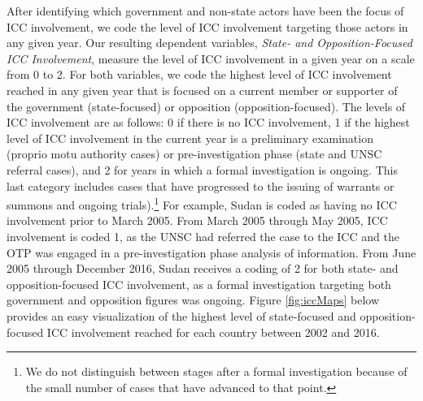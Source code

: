 After identifying which government and non-state actors have been the focus of ICC involvement, we code the level of ICC involvement targeting those actors in any given year. Our resulting dependent variables, \emph{State- and Opposition-Focused ICC Involvement}, measure the level of ICC involvement in a given year on a scale from 0 to 2. For both variables, we code the highest level of ICC involvement reached in any given year that is focused on a current member or supporter of the government (state-focused) or opposition (opposition-focused). The levels of ICC involvement are as follows: 0 if there is no ICC involvement, 1 if the highest level of ICC involvement in the current year is a preliminary examination (proprio motu authority cases) or pre-investigation phase (state and UNSC referral cases), and 2 for years in which a formal investigation is ongoing. This last category includes cases that have progressed to the issuing of warrants or summons and ongoing trials).\footnote{We do not distinguish between stages after a formal investigation because of the small number of cases that have advanced to that point.} For example, Sudan is coded as having no ICC involvement prior to March 2005. From March 2005 through May 2005, ICC involvement is coded 1, as the UNSC had referred the case to the ICC and the OTP was engaged in a pre-investigation phase analysis of information. From June 2005 through December 2016, Sudan receives a coding of 2 for both state- and opposition-focused ICC involvement, as a formal investigation targeting both government and opposition figures was ongoing. Figure \ref{fig:iccMaps} below provides an easy visualization of the highest level of state-focused and opposition-focused ICC involvement reached for each country between 2002 and 2016.

